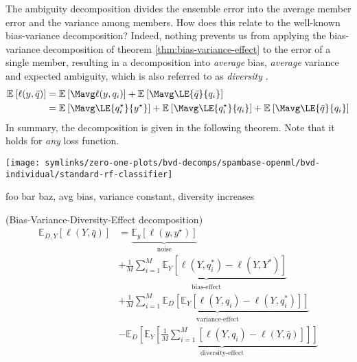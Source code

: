 \documentclass[../main.tex]{subfiles}
\begin{document}
The ambiguity decomposition divides the ensemble error into the average member error and the variance among members. How does this relate to the well-known bias-variance decomposition? Indeed, nothing prevents us from applying the bias-variance decomposition of theorem \ref{thm:bias-variance-effect} to the error of a single member, resulting in a decomposition into \textit{average} bias, \textit{average} variance and expected ambiguity, which is also referred to as \textit{diversity} \cite{wood23}.
$$
\begin{align}
\mathbb{E}_{}\left[ \ell(y, \bar{q} ) \right]  &=  
\mathbb{E}_{}\left[ \Mavg \ell(y, q_{i} ) \right]  
+  
\mathbb{E}_{}\left[ \Mavg \LE{\bar{q}}{q_{i}} \right]  \\
&= \mathbb{E}_{}\left[ \Mavg \LE{q_{i}^\star}{y^\star } \right]  + \mathbb{E}_{}\left[ \Mavg \LE{q_{i}^\star}{q_{i}} \right] + \mathbb{E}_{}\left[ \Mavg \LE{\bar{q}}{q_{i}} \right] 
\end{align}
$$
In summary, the decomposition is given in the following theorem. Note that it holds for \textit{any} loss function. 

\begin{marginfigure}
    \texttt{[image: symlinks/zero-one-plots/bvd-decomps/spambase-openml/bvd-individual/standard-rf-classifier]}
    \label{fig:spambase-standard-rf-classifier-bvd}
    \caption{
        foo bar baz, avg bias, variance constant, diversity increases
    }
\end{marginfigure}

\begin{theorem} (Bias-Variance-Diversity-Effect decomposition)
\begin{align*}
    \mathbb{E}_{D,Y}\left[ \ell(Y, \bar{q}) \right] &= 
    \underbrace{ \mathbb{E}_{y}\left[ \ell(y, y^\star) \right] }_{\text{noise}} \\
    &+
    \underbrace{
        \frac{1}{M} \sum_{i=1}^M \mathbb{E}_Y\left[\ell\left(Y, q_i^*\right)-\ell\left(Y, Y^*\right)\right]
    }_{\overline{\text{bias-effect}}} \\
    &+
    \underbrace{
        \frac{1}{M} \sum_{i=1}^M \mathbb{E}_D\left[\mathbb{E}_Y\left[\ell\left(Y, q_i\right)-\ell\left(Y, q_i^*\right)\right]\right]
    }_{\overline{\text{variance-effect}}} \\
    &- %
    \underbrace{
    \mathbb{E}_D\left[\mathbb{E}_Y\left[\frac{1}{M} \sum_{i=1}^M\left[\ell\left(Y, q_i\right)-\ell(Y, \bar{q})\right]\right]\right]
    }_{\text{diversity-effect}}
\end{align*}
\end{theorem}
\end{document}
